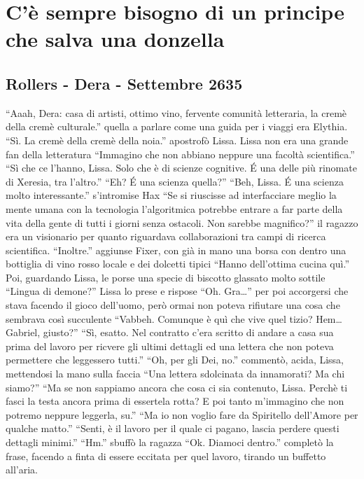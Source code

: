 \chapter{C'è sempre bisogno di un principe che salva una donzella}

  \section{Rollers - Dera - Settembre 2635}

    ``Aaah, Dera: casa di artisti, ottimo vino, fervente comunità
    letteraria, la cremè della cremè culturale.'' quella a parlare come una
    guida per i viaggi era Elythia. ``Sì. La cremè della cremè della
    noia.'' apostrofò Lissa. Lissa non era una grande fan della
    letteratura ``Immagino che non abbiano neppure una facoltà
    scientifica.'' ``Sì che ce l'hanno, Lissa. Solo che è di scienze
    cognitive. \'E una delle più rinomate di Xeresia, tra l'altro.'' ``Eh?
    \'E una scienza quella?'' ``Beh, Lissa. \'E una scienza molto
    interessante.'' s'intromise Hax ``Se si riuscisse ad interfacciare
    meglio la mente umana con la tecnologia l'algoritmica potrebbe entrare
    a far parte della vita della gente di tutti i giorni senza ostacoli.
    Non sarebbe magnifico?'' il ragazzo era un visionario per quanto
    riguardava collaborazioni tra campi di ricerca scientifica.
    ``Inoltre.'' aggiunse Fixer, con già in mano una borsa con dentro una bottiglia di vino
    rosso locale e dei dolcetti tipici ``Hanno dell'ottima cucina quì.''
    Poi, guardando Lissa, le porse una specie di biscotto glassato molto
    sottile ``Lingua di demone?'' Lissa lo prese e rispose ``Oh.
    Gra\dots{}'' per poi accorgersi che stava facendo il gioco dell'uomo,
    però ormai non poteva rifiutare una cosa che sembrava così succulente
    ``Vabbeh. Comunque è quì che vive quel tizio? Hem\dots{} Gabriel,
    giusto?'' ``Sì, esatto. Nel contratto c'era scritto di andare a casa
    sua prima del lavoro per ricvere gli ultimi dettagli ed una lettera che
    non poteva permettere che leggessero tutti.'' ``Oh, per gli Dei, no.''
    commentò, acida, Lissa, mettendosi la mano sulla faccia ``Una lettera
    sdolcinata da innamorati? Ma chi siamo?'' ``Ma se non sappiamo ancora
    che cosa ci sia contenuto, Lissa. Perchè ti fasci la testa ancora prima
    di essertela rotta? E poi tanto m'immagino che non potremo neppure
    leggerla, su.'' ``Ma io non voglio fare da Spiritello dell'Amore per
    qualche matto.'' ``Senti, è il lavoro per il quale ci pagano, lascia
    perdere questi dettagli minimi.'' ``Hm.'' sbuffò la ragazza ``Ok.
    Diamoci dentro.'' completò la frase, facendo a finta di essere eccitata
    per quel lavoro, tirando un buffetto all'aria.

